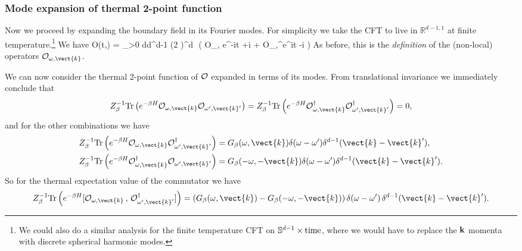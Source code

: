 \subsubsection{Mode expansion of thermal 2-point function}

Now we proceed by expanding the boundary field in its Fourier modes. For simplicity we take the CFT to live in ${\mathbb R}^{d-1,1}$ at finite temperature.\footnote{We could also do a similar analysis for the finite temperature CFT on ${\mathbb S}^{d-1}\times {\rm time}$, where we would have to replace the ${\bf k}$ momenta with discrete spherical harmonic modes.} We have  
\be
\label{modesa}
{\cal O}(t,) = \int_{\omega>0} {d\omega d^{d-1} \over (2 \pi)^d} \,\,\left( {\cal O}_{\omega,} e^{-i\omega t +i  } +  {\cal O}_{\omega,}^\dagger e^{i\omega t -i  }\right) 
\ee
As before, this is the {\it definition} of the (non-local) operators ${\cal O}_{\omega,\vect{k}}$.

We can now consider the thermal 2-point function of ${\cal O}$ expanded in terms of its modes. From translational invariance we immediately conclude that
\[
Z_{\beta}^{-1}{\rm Tr}\left(e^{-\beta H} {\cal O}_{\omega,\vect{k}} {\cal O}_{\omega',\vect{k}'} \right) =  
Z_{\beta}^{-1}{\rm Tr}\left(e^{-\beta H} {\cal O}_{\omega,\vect{k}}^\dagger {\cal O}_{\omega',\vect{k}'}^\dagger \right) =0,
\]
and for the other combinations we have
\begin{align}
\nonumber 
&Z_{\beta}^{-1}{\rm Tr}\left(e^{-\beta H} {\cal O}_{\omega,\vect{k}} {\cal O}_{\omega',\vect{k}'}^\dagger \right)
= G_\beta(\omega,\vect{k}) \delta(\omega-\omega') \delta^{d-1}(\vect{k}-\vect{k}'), \\
\nonumber
&Z_{\beta}^{-1}{\rm Tr}\left(e^{-\beta H} {\cal O}_{\omega,\vect{k}}^\dagger {\cal O}_{\omega',\vect{k}'} \right)
= G_\beta(-\omega,-\vect{k}) \delta(\omega-\omega') \delta^{d-1}(\vect{k}-\vect{k}').
\end{align}
So for the thermal expectation value of the commutator we have
\[
Z_{\beta}^{-1}{\rm Tr}\left(e^{-\beta H} [{\cal O}_{\omega,\vect{k}}\,,\, {\cal O}_{\omega',\vect{k}'}^\dagger] \right)
= \left(G_\beta(\omega,\vect{k})- G_\beta(-\omega,-\vect{k}) \right)\delta(\omega-\omega') \,\delta^{d-1}(\vect{k}-\vect{k}').
\]


